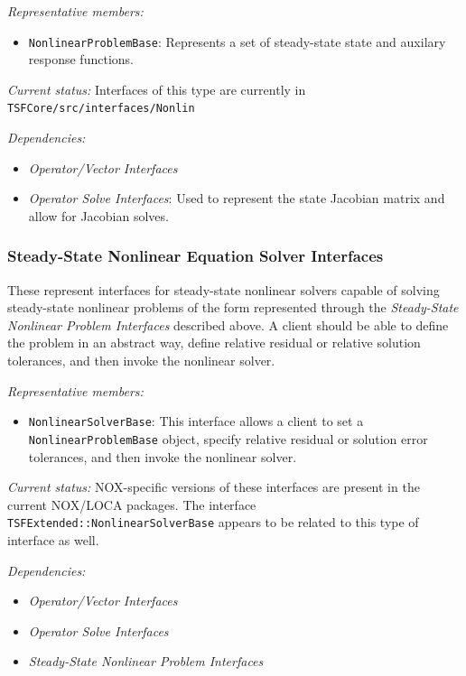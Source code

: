 \documentclass[pdf,ps2pdf,11pt]{SANDreport}
\begin{document}
{}\textit{Representative members:}
\begin{itemize}
%
{}\item {}\texttt{NonlinearProblemBase}: Represents a set of steady-state
state and auxilary response functions.
%
\end{itemize}

{}\textit{Current status:} Interfaces of this type are currently in
{}\texttt{TSFCore/src/interfaces/Nonlin}

{}\textit{Dependencies:}
\begin{itemize}
\item {}\textit{Operator/Vector Interfaces}
\item {}\textit{Operator Solve Interfaces}: Used to represent the state
Jacobian matrix and allow for Jacobian solves.
\end{itemize}

%
\subsubsection{Steady-State Nonlinear Equation Solver Interfaces}
%

These represent interfaces for steady-state nonlinear solvers capable of
solving steady-state nonlinear problems of the form represented through the
{}\textit{Steady-State Nonlinear Problem Interfaces} described above.  A
client should be able to define the problem in an abstract way, define
relative residual or relative solution tolerances, and then invoke the
nonlinear solver.

{}\textit{Representative members:}
\begin{itemize}
%
{}\item {}\texttt{NonlinearSolverBase}: This interface allows a client to set
a {}\texttt{NonlinearProblemBase} object, specify relative residual or
solution error tolerances, and then invoke the nonlinear solver.
%
\end{itemize}

{}\textit{Current status:} NOX-specific versions of these interfaces are
present in the current NOX/LOCA packages.  The interface
{}\texttt{TSFExtended\-::Nonlinear\-Solver\-Base} appears to be related to
this type of interface as well.

{}\textit{Dependencies:}
\begin{itemize}
\item {}\textit{Operator/Vector Interfaces}
\item {}\textit{Operator Solve Interfaces}
\item {}\textit{Steady-State Nonlinear Problem Interfaces}
\end{itemize}
\end{document}
